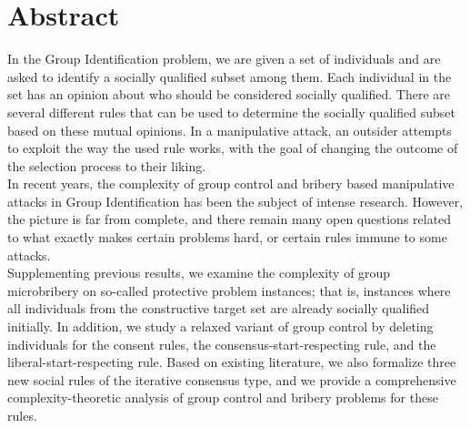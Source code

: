 \documentclass[
    12pt,               %
    a4paper,            %
    bibtotoc,           %
    pointlessnumbers,   %
    ngerman,            %
    titlepage,          %
    leqno,              %
    ]{scrarticle}       %
\begin{document}
\cleardoublepage


\onehalfspacing




\section*{Abstract}

In the Group Identification problem, we are given a set of individuals and are asked to identify a socially qualified subset among them. Each individual in the set has an opinion about who should be considered socially qualified. There are several different rules that can be used to determine the socially qualified subset based on these mutual opinions. In a manipulative attack, an outsider attempts to exploit the way the used rule works, with the goal of changing the outcome of the selection process to their liking.
\\
In recent years, the complexity of group control and bribery based manipulative attacks in Group Identification has been the subject of intense research. However, the picture is far from complete, and there remain many open questions related to what exactly makes certain problems hard, or certain rules immune to some attacks.
\\
Supplementing previous results, we examine the complexity of group microbribery on so-called protective problem instances; that is, instances where all individuals from the constructive target set are already socially qualified initially. In addition, we study a relaxed variant of group control by deleting individuals for the consent rules, the consensus-start-respecting rule, and the liberal-start-respecting rule. Based on existing literature, we also formalize three new social rules of the iterative consensus type, and we provide a comprehensive complexity-theoretic analysis of group control and bribery problems for these rules.

\cleardoublepage



\end{document}
